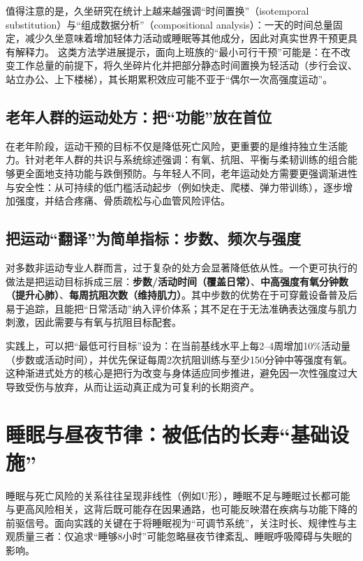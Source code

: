 \documentclass[11pt,a4paper]{article}
\begin{document}
值得注意的是，久坐研究在统计上越来越强调“时间置换”（isotemporal substitution）与“组成数据分析”（compositional analysis）：一天的时间总量固定，减少久坐意味着增加轻体力活动或睡眠等其他成分，因此对真实世界干预更具有解释力。\cite{acompositionalanalysis2021,revisitingtheassociation2021} 这类方法学进展提示，面向上班族的“最小可行干预”可能是：在不改变工作总量的前提下，将久坐碎片化并把部分静态时间置换为轻活动（步行会议、站立办公、上下楼梯），其长期累积效应可能不亚于“偶尔一次高强度运动”。\cite{associationofleisure2016,theassociationbetween2017}

\subsection{老年人群的运动处方：把“功能”放在首位}

在老年阶段，运动干预的目标不仅是降低死亡风险，更重要的是维持独立生活能力。针对老年人群的共识与系统综述强调：有氧、抗阻、平衡与柔韧训练的组合能够更全面地支持功能与跌倒预防\cite{internationalexerciserecommendations2021,physicalactivityand2010}。与年轻人不同，老年运动处方需要更强调渐进性与安全性：从可持续的低门槛活动起步（例如快走、爬楼、弹力带训练），逐步增加强度，并结合疼痛、骨质疏松与心血管风险评估。

\subsection{把运动“翻译”为简单指标：步数、频次与强度}

对多数非运动专业人群而言，过于复杂的处方会显著降低依从性。一个更可执行的做法是把运动目标拆成三层：\textbf{步数/活动时间（覆盖日常）}、\textbf{中高强度有氧分钟数（提升心肺）}、\textbf{每周抗阻次数（维持肌力）}。其中步数的优势在于可穿戴设备普及后易于追踪，且能把“日常活动”纳入评价体系；其不足在于无法准确表达强度与肌力刺激，因此需要与有氧与抗阻目标配套。\cite{dailystepsand2022,associationofdaily2020}

实践上，可以把“最低可行目标”设为：在当前基线水平上每2--4周增加10\%活动量（步数或活动时间），并优先保证每周2次抗阻训练与至少150分钟中等强度有氧\cite{who2020physicalactivity,pagac2018}。这种渐进式处方的核心是把行为改变与身体适应同步推进，避免因一次性强度过大导致受伤与放弃，从而让运动真正成为可复利的长期资产。

\section{睡眠与昼夜节律：被低估的长寿“基础设施”}

睡眠与死亡风险的关系往往呈现非线性（例如U形），睡眠不足与睡眠过长都可能与更高风险相关，这背后既可能存在因果通路，也可能反映潜在疾病与功能下降的前驱信号。面向实践的关键在于将睡眠视为“可调节系统”，关注时长、规律性与主观质量三者：仅追求“睡够8小时”可能忽略昼夜节律紊乱、睡眠呼吸障碍与失眠的影响。
\end{document}
